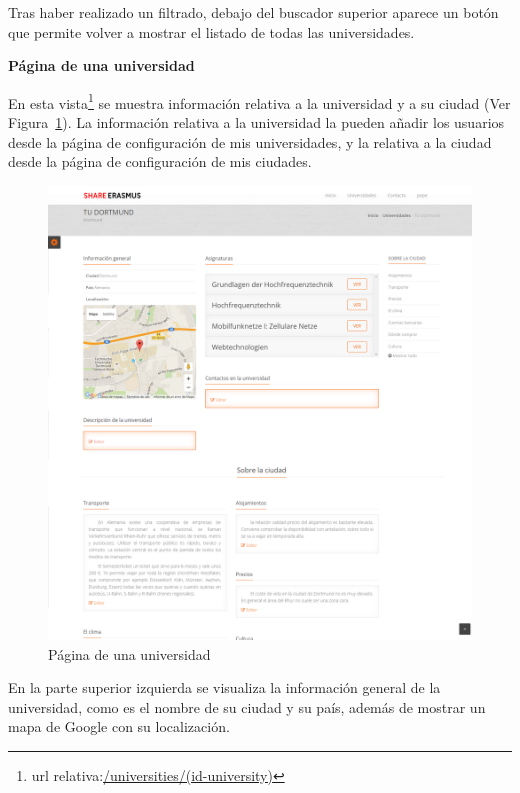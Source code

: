 \documentclass[a4paper, 12pt]{book}
\begin{document}
Tras haber realizado un filtrado, debajo del buscador superior aparece un botón que permite volver a mostrar el listado de todas las universidades.

{\large  \textbf{Página de una universidad}\par}

En esta vista\footnote{url relativa:\url{/universities/(id-university)}} se muestra información relativa a la universidad y a su ciudad (Ver Figura~\ref{fig:universidad}). La información relativa a la universidad la pueden añadir los usuarios desde la página de configuración de mis universidades, y la relativa a la ciudad desde la página de configuración de mis ciudades.


\begin{figure}[H]
  \centering
  \includegraphics[width=16cm, keepaspectratio]{img/universidad.png}
  \caption{Página de una universidad}
  \label{fig:universidad}
\end{figure}

En la parte superior izquierda se visualiza la información general de la universidad, como es el nombre de su ciudad y su país, además de mostrar un mapa de Google con su localización.
\newline
\end{document}
